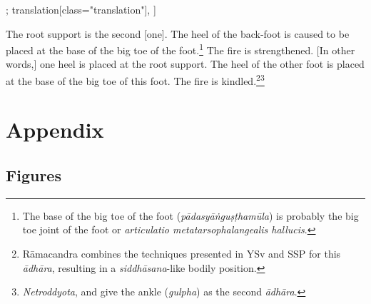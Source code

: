 \begin{alignment}[
  texts=edition[class="edition"];
  translation[class="translation"],
  ]
\begin{translation}
\begin{tlate}[p30_01]
     The root support is the second [one]. The heel of the back-foot is caused to be placed at the base of the big toe of the foot.\footnote{The base of the big toe of the foot (\textit{pādasyāṅguṣṭhamūla}) is probably the big toe joint of the foot or \textit{articulatio metatarsophalangealis hallucis}.} The fire is strengthened.
     [In other words,] one heel is placed at the root support. The heel of the other foot is placed at the base of the big toe of this foot. The fire is kindled.\footnote{Rāmacandra combines the techniques presented in YSv and SSP for this \textit{ādhāra}, resulting in a \textit{siddhāsana}-like bodily position.}\fnsep\footnote{\textit{Netroddyota},  and  give the ankle (\textit{gulpha}) as the second \textit{ādhāra}.}

      \flushpage 
    \end{tlate}
  \end{translation}
\end{alignment}
\pagebreak %
\cleardoublepage
{}
\chapter{Appendix}
\section{Figures}
 
\clearpage

